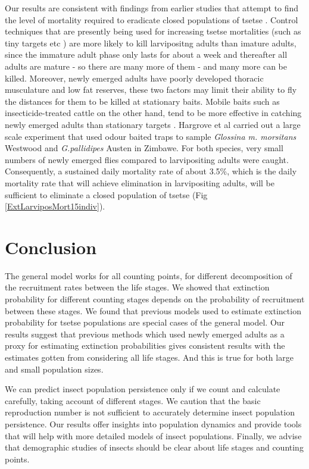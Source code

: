 \documentclass[smallextended]{svjour3}
\begin{document}
Our results are consistent with findings from earlier studies that attempt to find the level of mortality required to eradicate closed populations of tsetse \cite{Hargrove2005a, Kajunguri2019}. Control techniques that are presently being used for increasing tsetse mortalities (such as tiny targets etc \cite{Hargrove2000,Esterhuizen2006,Shaw2015,Mbewe2018a}) are more likely to kill larvipositng adults than imature adults, since the immature adult phase only lasts for  about a week and thereafter all adults are mature - so there are many more of them - and many more can be killed. Moreover, newly emerged adults have poorly developed thoracic musculature and low fat reserves, these two factors may limit their ability to fly the distances for them to be killed at stationary baits. Mobile baits such as insecticide-treated cattle on the other hand, tend to be more effective in catching newly emerged adults than stationary targets \cite{Hargrove1991}. Hargrove et al \cite{HargroveJ.W.HollowayM.T.P.ValeG.A.GoughA.J.E.Hall1995} carried out a large scale experiment that used  odour baited traps to sample  {\it Glossina m. morsitans} Westwood and {\it G.pallidipes} Austen in Zimbawe. For both species, very small numbers of newly emerged flies compared to larvipositing adults were caught. Consequently, a sustained daily mortality rate of about 3.5\%, which is the daily mortality rate that will achieve elimination in larvipositing adults, will be sufficient to eliminate a closed population of tsetse (Fig \ref{ExtLarviposMort15indiv}).

\section{Conclusion}
\label{section9}
The general model works for all counting points, for different decomposition of the recruitment rates between the life stages. We showed that extinction probability for different counting stages depends on the probability of recruitment between these stages. We found that previous models used to estimate extinction probability for tsetse populations are special cases of the general model. Our results suggest that previous methods which used newly emerged adults as a proxy for estimating extinction probabilities gives consistent results with the estimates gotten from considering all life stages. And this is true for both large and small population sizes.


We can predict insect population persistence only if we count and calculate carefully, taking account of different stages. We caution that the basic reproduction number is not sufficient to accurately determine insect population persistence. Our results offer insights into population dynamics and provide tools that will help with more detailed models of insect populations. Finally, we advise that demographic studies of insects should be clear about life stages and counting points.
\end{document}
